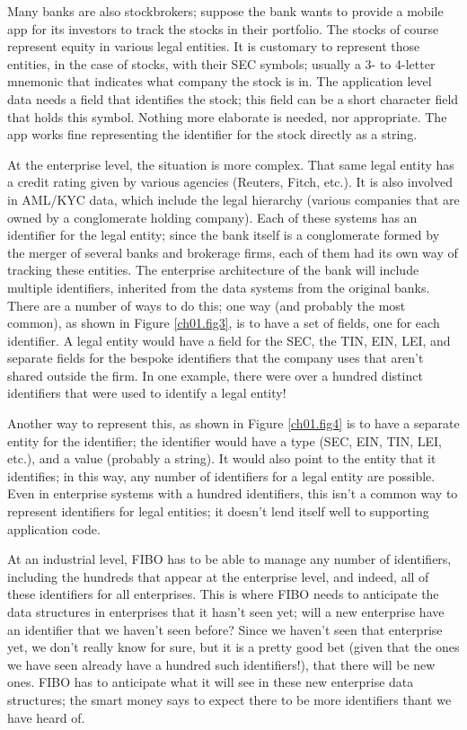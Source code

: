 Many banks are also stockbrokers; suppose the bank wants to provide a mobile app for its investors to track the stocks in their portfolio.  The stocks of course represent equity in various legal entities.  It is customary to represent those entities, in the case of stocks, with their SEC symbols; usually a 3- to 4-letter mnemonic that indicates what company the stock is in.  The application level data needs a field that identifies the stock; this field can be a short character field that holds this symbol.  Nothing more elaborate is needed, nor appropriate.  The app works fine representing the identifier for the stock directly as a string. 

At the enterprise level, the situation is more complex.  That same legal entity has a credit rating given by various agencies (Reuters, Fitch, etc.).  It is also involved in AML/KYC data, which include the legal hierarchy (various companies that are owned by a conglomerate holding company).  Each of these systems has an identifier for the legal entity; since the bank itself is a conglomerate formed by the merger of several banks and brokerage firms, each of them had its own way of tracking these entities.  The enterprise architecture of the bank will include multiple identifiers, inherited from the data systems from the original banks.  There are a number of ways to do this; one way (and probably the most common), as shown in Figure \ref{ch01.fig3}, is to have a set of fields, one  for each identifier.  A legal entity would have a field for the SEC, the TIN, EIN, LEI, and separate fields for the bespoke identifiers that the company uses that aren't shared outside the firm.  In one example, there were over a hundred distinct identifiers that were used to identify a legal entity!  

Another way to represent this, as shown in Figure \ref{ch01.fig4} is to have a separate entity for the identifier;  the identifier would have a type (SEC, EIN, TIN, LEI, etc.), and a value (probably a string).  It would also point to the entity that it identifies; in this way, any number of identifiers for a legal entity are possible.  Even in enterprise systems with a hundred identifiers, this isn't a common way to represent identifiers for legal entities; it doesn't lend itself well to supporting application code.  

At an industrial level, FIBO has to be able to manage any number of identifiers, including the hundreds that appear at the enterprise level, and indeed, all of these identifiers for all enterprises.  This is where FIBO needs to anticipate the data structures in enterprises that it hasn't seen yet; will a new enterprise have an identifier that we haven't seen before?  Since we haven't seen that enterprise yet, we don't really know for sure, but it is a pretty good bet (given that the ones we have seen already have a hundred such identifiers!), that there will be new ones.  FIBO has to anticipate what it will see in these new enterprise data structures; the smart money says to expect there to be more identifiers thant we have heard of. 

